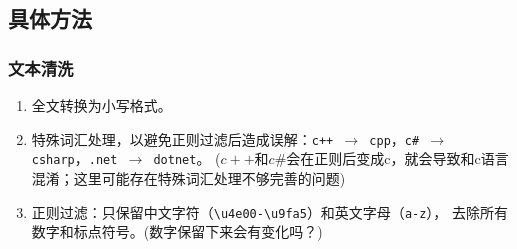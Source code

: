 \documentclass[12pt,a4paper]{ctexart}
\begin{document}
\subsection{具体方法}

\subsubsection{文本清洗}
\begin{enumerate}
\item 全文转换为小写格式。
\item 特殊词汇处理，以避免正则过滤后造成误解：\texttt{c++ $\to$ cpp}，\texttt{c\# $\to$ csharp}，\texttt{.net $\to$ dotnet}。 ($c++ $和$ c\# $会在正则后变成c，就会导致和c语言混淆；这里可能存在特殊词汇处理不够完善的问题)
\item 正则过滤：只保留中文字符（\texttt{\textbackslash u4e00-\textbackslash u9fa5}）和英文字母（\texttt{a-z}），
去除所有数字和标点符号。(数字保留下来会有变化吗？)
\end{enumerate}
\end{document}
